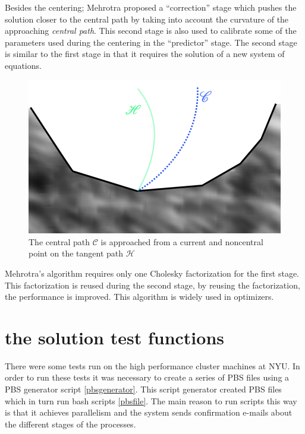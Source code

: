 Besides the centering; Mehrotra proposed a ``correction'' stage which pushes the solution closer to the central path by taking into account the curvature of the approaching \emph{central path}. This second stage is also used to calibrate some of the parameters used during the centering in the ``predictor'' stage. The second stage is similar to the first stage in that it requires the solution of a new system of equations.

\begin{figure}
\begin{center}
\includegraphics[scale=0.3]{Figures/CentralPath.png}
\caption{The central path $\mathcal{C}$ is approached from a current and noncentral point on the tangent path $\mathcal{H}$}
\end{center}
\end{figure}

Mehrotra's algorithm requires only one Cholesky factorization for the first stage. This factorization is reused during the second stage, by reusing the factorization, the performance is improved.  This algorithm is widely used in optimizers.

\chapter{the solution test functions}

There were some tests run on the high performance cluster machines at NYU. In order to run these tests it was necessary to create a series of PBS files using a PBS generator script \ref{pbsgenerator}. This script generator created PBS files which in turn run bash scripts \ref{pbsfile}. The main reason to run scripts this way is that it achieves parallelism and the system sends confirmation e-mails about the different stages of the processes. 

